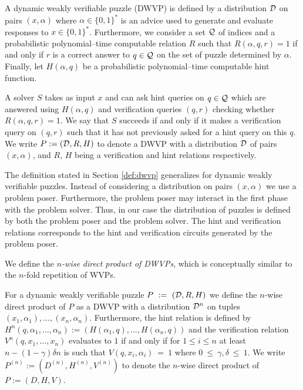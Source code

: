 \begin{definition}
  \label{def:dwvp_dodis}
  A \textnormal{dynamic weakly verifiable puzzle} (DWVP) is defined by a distribution $\mathcal{D}$ on pairs $(x, \alpha)$
  where $\alpha \in \{0,1\}^{*}$ is an advice used to generate and evaluate responses to $x \in \{0,1\}^{*}$.
  Furthermore, we consider a set $\mathcal{Q}$ of indices and a probabilistic polynomial--time computable relation $R$ such that
  $R(\alpha, q, r) = 1$ if and only if $r$ is a correct answer to $q \in \mathcal{Q}$ on the set of puzzle determined by $\alpha$.
  Finally, let $H(\alpha, q)$ be a probabilistic polynomial--time computable \textnormal{hint} function.

  A solver $S$ takes as input $x$ and can ask hint queries on $q \in \mathcal{Q}$ which are answered using $H(\alpha, q)$ and verification queries $(q,r)$
  checking whether $R(\alpha,q,r) = 1$. We say that $S$ succeeds if and only if it makes a verification query on $(q,r)$ such that it
  has not previously asked for a hint query on this $q$. We write $P := (\mathcal{D}, R, H)$ to denote a DWVP with a distribution
  $\mathcal{D}$ of pairs $(x, \alpha)$, and $R$, $H$ being a verification and hint relations respectively.
\end{definition}
%
The definition stated in Section \ref{def:dwvp} generalizes for dynamic weakly verifiable puzzles.
Instead of considering a distribution on pairs $(x,\alpha)$ we use a problem poser.
Furthermore, the problem poser may interact in the first phase with the problem solver.
Thus, in our case the distribution of puzzles is defined by both the problem poser and the problem solver.
The hint and verification relations corresponds to the hint and verification circuits generated by the problem poser.
%

We define the \textit{$n$-wise direct product of DWVPs}, which is conceptually similar to the $n$-fold repetition of WVPs.
%
\begin{definition}
For a dynamic weakly verifiable puzzle $P~:=~(\mathcal{D}, R, H)$ we define the $n$-wise direct product of $P$
as a DWVP with a distribution $\mathcal{D}^n$ on tuples $(x_1, \alpha_1), \dotsc, (x_n, \alpha_n)$.
Furthermore, the hint relation is defined by $H^n(q, \alpha_1, \dotsc, \alpha_n) := (H(\alpha_1, q), \dotsc, H(\alpha_n, q))$ and
the verification relation $V^n(q, x_1, \dotsc, x_n)$ evaluates to $1$ if and only if
for $1 \leq i \leq n$ at least $n - (1 - \gamma)\delta n$ is such that $V(q, x_i,\alpha_i)~=~1$
where $0~\leq~\gamma,\delta~\leq~1$.
%
We write $P^{(n)} := (D^{(n)}, H^{(n)}, V^{(n)})$ to denote the $n$-wise direct product of $P := (D,H,V)$.
%
\end{definition}

